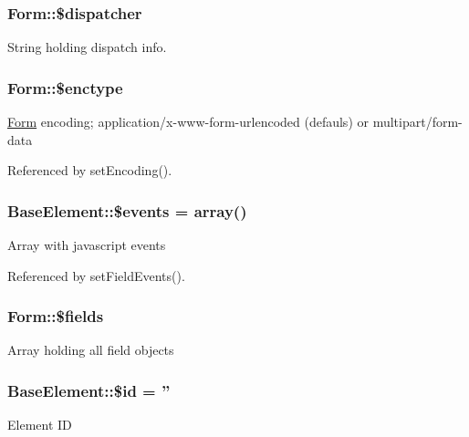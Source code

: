 \subsubsection[{\$dispatcher}]{\setlength{\rightskip}{0pt plus 5cm}Form::\$dispatcher}\label{classForm_ab02292e715af1dc9b0499dd20900aa92}
String holding dispatch info. 
\subsubsection[{\$enctype}]{\setlength{\rightskip}{0pt plus 5cm}Form::\$enctype}\label{classForm_a9c23b3ec186995d3df3ad6d4d5efc134}
\hyperlink{classForm}{Form} encoding; application/x-\/www-\/form-\/urlencoded (defauls) or multipart/form-\/data 

Referenced by setEncoding().

\subsubsection[{\$events}]{\setlength{\rightskip}{0pt plus 5cm}BaseElement::\$events = array()}\label{classBaseElement_a02cebe45d277b4ff8f29db08bad371ba}
Array with javascript events 

Referenced by setFieldEvents().

\subsubsection[{\$fields}]{\setlength{\rightskip}{0pt plus 5cm}Form::\$fields}\label{classForm_abcb1c4022c2b93073a00ae65f3269d5b}
Array holding all field objects 
\subsubsection[{\$id}]{\setlength{\rightskip}{0pt plus 5cm}BaseElement::\$id = ''}\label{classBaseElement_a11b6989c43b53869a09f5ce65aa55b45}
Element ID 
